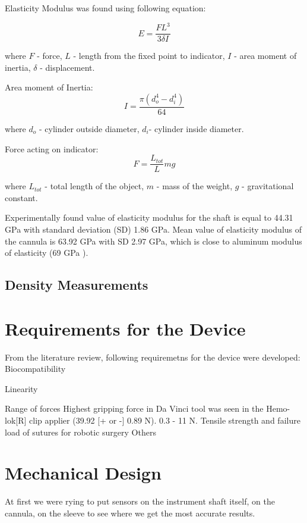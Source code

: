 Elasticity Modulus was found using following equation:

\begin{equation}
E = \frac{FL^3}{3 \delta I} 
\end{equation}

where $F$ - force, $L$ - length from the fixed point to indicator, $I$ - area moment of inertia, $\delta$ - displacement.

Area moment of Inertia: 
\begin{equation}
I = \frac{\pi (d_o^4 - d_i^4)}{64}
\end{equation}

where $d_o$ - cylinder outside diameter, $d_i$- cylinder inside diameter.

Force acting on indicator:
\begin{equation}
F = \frac{L_{tot}}{L}mg
\end{equation}

where $L_{tot}$ - total length of the object, $m$ - mass of the weight, $g$ - gravitational constant.

Experimentally found value of elasticity modulus for the shaft is equal to 44.31 GPa with standard deviation (SD) 1.86 GPa. Mean value of elasticity modulus of the cannula is 63.92 GPa with SD 2.97 GPa, which is close to aluminum modulus of elasticity (69 GPa \cite{youngs_modulus}).

	\subsection{Density Measurements}
	\label{sec:DenMeas}

\section{Requirements for the Device}
	\label{sec:DevReq}
	From the literature review, following requiremetns for the device were developed:
	Biocompatibility
	
	Linearity
	
	Range of forces 
	Highest gripping force in Da Vinci tool was seen in the Hemo-lok[R] clip applier (39.92 [+ or -] 0.89 N).
	0.3 - 11 N. 
	Tensile strength and failure load of sutures for robotic surgery
	Others

\section{Mechanical Design}
\label{sec:mechDes}
At first we were rying to put sensors on the instrument shaft itself, on the cannula, on the sleeve to see where we get the most accurate results. 

